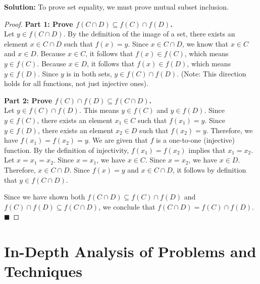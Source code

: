 \documentclass[11pt, a4paper]{article}
\theoremstyle{definition}
\theoremstyle{remark}
\begin{document}
\textbf{Solution:}
To prove set equality, we must prove mutual subset inclusion.
\begin{proof}
\textbf{Part 1: Prove $f(C \cap D) \subseteq f(C) \cap f(D)$.} \\
Let $y \in f(C \cap D)$. By the definition of the image of a set, there exists an element $x \in C \cap D$ such that $f(x) = y$. 
Since $x \in C \cap D$, we know that $x \in C$ and $x \in D$. 
Because $x \in C$, it follows that $f(x) \in f(C)$, which means $y \in f(C)$. 
Because $x \in D$, it follows that $f(x) \in f(D)$, which means $y \in f(D)$. 
Since $y$ is in both sets, $y \in f(C) \cap f(D)$. (Note: This direction holds for all functions, not just injective ones).

\textbf{Part 2: Prove $f(C) \cap f(D) \subseteq f(C \cap D)$.} \\
Let $y \in f(C) \cap f(D)$. This means $y \in f(C)$ and $y \in f(D)$. 
Since $y \in f(C)$, there exists an element $x_1 \in C$ such that $f(x_1) = y$. 
Since $y \in f(D)$, there exists an element $x_2 \in D$ such that $f(x_2) = y$. 
Therefore, we have $f(x_1) = f(x_2) = y$. 
We are given that $f$ is a one-to-one (injective) function. By the definition of injectivity, $f(x_1) = f(x_2)$ implies that $x_1 = x_2$. 
Let $x = x_1 = x_2$. Since $x = x_1$, we have $x \in C$. Since $x = x_2$, we have $x \in D$. 
Therefore, $x \in C \cap D$. 
Since $f(x) = y$ and $x \in C \cap D$, it follows by definition that $y \in f(C \cap D)$. 

Since we have shown both $f(C \cap D) \subseteq f(C) \cap f(D)$ and $f(C) \cap f(D) \subseteq f(C \cap D)$, we conclude that $f(C \cap D) = f(C) \cap f(D)$. $\blacksquare$
\end{proof}

\newpage
\section{In-Depth Analysis of Problems and Techniques}
\end{document}
